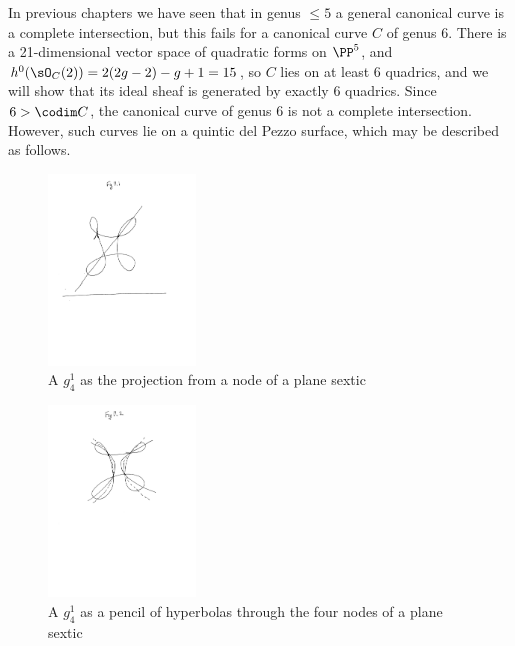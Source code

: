  In previous chapters we have seen that in genus $\leq 5$ a general canonical curve is  a complete intersection, but this fails for a canonical curve $C$ of genus 6. There is a 21-dimensional vector space of
quadratic forms on $\PP^5$, and $h^0(\sO_C(2)) = 2(2g-2)-g+1 = 15$, so $C$ lies on at least 6 quadrics, and we will show that its ideal sheaf is generated by exactly 6 quadrics. Since $6>\codim C$, the canonical curve of genus 6 is not a complete intersection. However, such curves lie on a quintic del Pezzo surface, which may be described as follows.


%
 
\begin{figure}
\begin{center}
\centerline {\includegraphics[height=2in]{"Fig11.1.pdf"}}
\caption{A $g^1_4$ as the projection from a node of a plane sextic }
\label{default}
\end{center}
\end{figure}

\begin{figure}
\begin{center}
\centerline {\includegraphics[height=2in]{"Fig11.2.pdf"}}
\caption{A $g^1_4$ as a pencil of hyperbolas through the four nodes of a plane sextic}
\label{default}
\end{center}
\end{figure}
 
